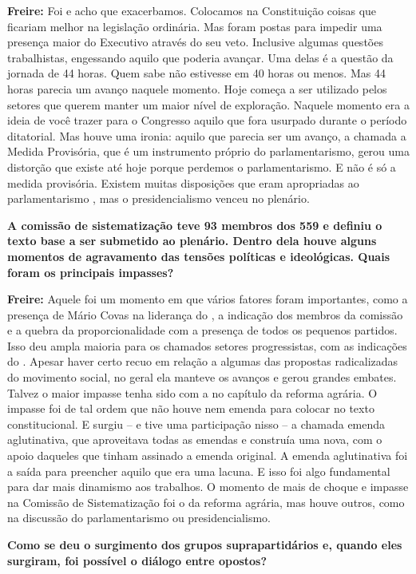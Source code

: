 \textbf{Freire:} Foi e acho que exacerbamos. Colocamos na Constituição
coisas que ficariam melhor na legislação ordinária. Mas foram postas
para impedir uma presença maior do Executivo através do seu veto.
Inclusive algumas questões trabalhistas, engessando aquilo que poderia
avançar. Uma delas é a questão da jornada de 44 horas. Quem sabe não
estivesse em 40 horas ou menos. Mas 44 horas parecia um avanço naquele
momento. Hoje começa a ser utilizado pelos setores que querem manter um
maior nível de exploração. Naquele momento era a ideia de você trazer
para o Congresso aquilo que fora usurpado durante o período ditatorial.
Mas houve uma ironia: aquilo que parecia ser um avanço, a chamada a
Medida Provisória, que é um instrumento próprio do parlamentarismo,
gerou uma distorção que existe até hoje porque perdemos o
parlamentarismo. E não é só a medida provisória. Existem muitas
disposições que eram apropriadas ao parlamentarismo , mas o
presidencialismo venceu no plenário.

\textbf{A comissão de sistematização teve 93 membros dos 559 e definiu o
texto base a ser submetido ao plenário. Dentro dela houve alguns
momentos de agravamento das tensões políticas e ideológicas. Quais foram
os principais impasses?}

\textbf{Freire:} Aquele foi um momento em que vários fatores foram
importantes, como a presença de Mário Covas na liderança do , a
indicação dos membros da comissão e a quebra da proporcionalidade com a
presença de todos os pequenos partidos. Isso deu ampla maioria para os
chamados setores progressistas, com as indicações do . Apesar haver
certo recuo em relação a algumas das propostas radicalizadas do
movimento social, no geral ela manteve os avanços e gerou grandes
embates. Talvez o maior impasse tenha sido com a  no capítulo da
reforma agrária. O impasse foi de tal ordem que não houve nem emenda
para colocar no texto constitucional. E surgiu -- e tive uma
participação nisso -- a chamada emenda aglutinativa, que aproveitava
todas as emendas e construía uma nova, com o apoio daqueles que tinham
assinado a emenda original. A emenda aglutinativa foi a saída para
preencher aquilo que era uma lacuna. E isso foi algo fundamental para
dar mais dinamismo aos trabalhos. O momento de mais de choque e impasse
na Comissão de Sistematização foi o da reforma agrária, mas houve
outros, como na discussão do parlamentarismo ou presidencialismo.

\textbf{Como se deu o surgimento dos grupos suprapartidários e, quando
eles surgiram, foi possível o diálogo entre opostos?}

